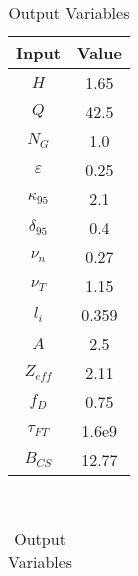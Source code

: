\begin{table}[b!]
\centering
\caption{ACT I Variables}
\hfill
\begin{subtable}[t]{0.4\textwidth}
\centering
\caption{Input Variables} ~\\
\begin{tabular}{ c|c }

Input            & Value           \\
\hline
$H$              & 1.65            \\
$Q$              & 42.5            \\
$N_{G}$          & 1.0             \\
$\varepsilon$       & 0.25            \\
$\kappa_{95}$    & 2.1             \\
$\delta_{95}$    & 0.4             \\
$\nu_{n}$        & 0.27            \\
$\nu_{T}$        & 1.15            \\
$l_{i}$          & 0.359         \\
$A$              & 2.5             \\
$Z_{eff}$        & 2.11            \\
$f_{D}$          & 0.75            \\
$\tau_{FT}$      & 1.6e9           \\
$B_{CS}$         & 12.77           \\

\end{tabular}
\end{subtable}
\hfill
\begin{subtable}[t]{0.5\textwidth}
\centering
\caption{Output Variables} ~\\
\begin{tabular}{ c|c|c }


\end{tabular}
\end{subtable}
\end{table}
